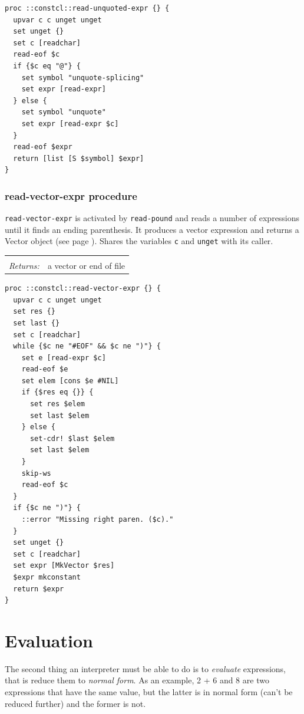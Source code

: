 \documentclass[twoside]{report}
\begin{document}
\begin{lstlisting}
proc ::constcl::read-unquoted-expr {} {
  upvar c c unget unget
  set unget {}
  set c [readchar]
  read-eof $c
  if {$c eq "@"} {
    set symbol "unquote-splicing"
    set expr [read-expr]
  } else {
    set symbol "unquote"
    set expr [read-expr $c]
  }
  read-eof $expr
  return [list [S $symbol] $expr]
}
\end{lstlisting}

\subsection{read-vector-expr procedure}
\label{readvectorexpr-procedure}

\texttt{read-vector-expr} is activated by \texttt{read-pound} and reads a number of expressions until it finds an ending parenthesis. It produces a vector expression and returns a Vector object (see page \pageref{vectors}). Shares the variables \texttt{c} and \texttt{unget} with its caller.

\noindent\begin{tabular}{ |p{1.9cm} p{8cm}| }
\hline
\rowcolor[HTML]{CCCCCC} \multicolumn{2}{|l|}{\bf read-vector-expr (internal)} \\
\textit{Returns:} & a vector or end of file \\
\hline
\end{tabular}

\begin{lstlisting}
proc ::constcl::read-vector-expr {} {
  upvar c c unget unget
  set res {}
  set last {}
  set c [readchar]
  while {$c ne "#EOF" && $c ne ")"} {
    set e [read-expr $c]
    read-eof $e
    set elem [cons $e #NIL]
    if {$res eq {}} {
      set res $elem
      set last $elem
    } else {
      set-cdr! $last $elem
      set last $elem
    }
    skip-ws
    read-eof $c
  }
  if {$c ne ")"} {
    ::error "Missing right paren. ($c)."
  }
  set unget {}
  set c [readchar]
  set expr [MkVector $res]
  $expr mkconstant
  return $expr
}
\end{lstlisting}

\chapter{Evaluation}
\label{evaluation}

The second thing an interpreter must be able to do is to \emph{evaluate} expressions, that is reduce them to \emph{normal form}. As an example, 2 + 6 and 8 are two expressions that have the same value, but the latter is in normal form (can't be reduced further) and the former is not.
\end{document}
